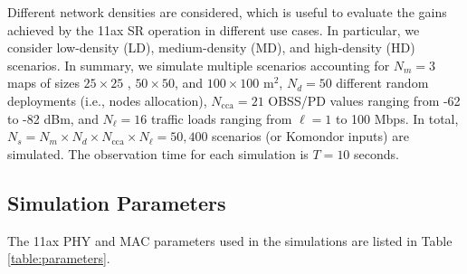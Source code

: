 \documentclass[conference]{IEEEtran}
\begin{document}
	Different network densities are considered, which is useful to evaluate the gains achieved by the 11ax SR operation in different use cases. In particular, we consider low-density (LD), medium-density (MD), and high-density (HD) scenarios. In summary, we simulate multiple scenarios accounting for $N_m = 3$ maps of sizes $25 \times 25$ , $50 \times 50$, and $100 \times 100$ m$^2$, $N_d = 50$ different random deployments (i.e., nodes allocation), $N_\text{cca} = 21$ OBSS/PD values ranging from -62 to -82 dBm, and $N_\ell = 16$ traffic loads ranging from $\ell = 1$ to 100 Mbps. In total, $N_s =  N_m \times N_d \times N_\text{cca} \times N_\ell = 50,400$ scenarios (or Komondor inputs) are simulated. The observation time for each simulation is $T = 10$ seconds.
	
	\subsection{Simulation Parameters}
	
	The 11ax PHY and MAC parameters used in the simulations are listed in Table \ref{table:parameters}.
	
\end{document}
